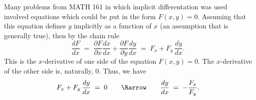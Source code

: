 \documentclass[12pt,fleqn]{article}
\begin{document}
Many problems from MATH 161 in which implicit differentation was used
involved equations which could be put in the form $F(x,y) = 0$.
Assuming that this equation defines $y$ implicitly as a function of
$x$ (an assumption that is generally true), then by the chain rule
$$ \frac{dF}{dx} \;=\; \frac{\partial F}{\partial x}\frac{dx}{dx}
	+ \frac{\partial F}{\partial y}\frac{dy}{dx}
	\;=\; F_x + F_y\,\frac{dy}{dx}. $$
This is the $x$-derivative of one side of the equation $F(x,y) = 0$.
The $x$-derivative of the other side is, naturally, 0.  Thus, we have
$$ F_x + F_y\,\frac{dy}{dx} \;=\; 0 \qquad\Rarrow\qquad
	\frac{dy}{dx} \;=\; -\frac{F_x}{F_y}. $$
\end{document}
